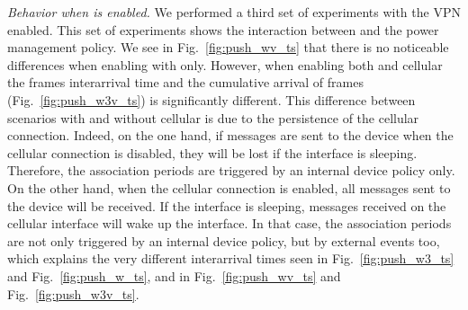 




\noindent\emph{Behavior when \meddle is enabled.} We performed a third set of experiments with the VPN enabled. This set
of experiments shows the interaction between \meddle 
and the power management policy. We see in
Fig.~\ref{fig:push_wv_ts} that
there is no noticeable differences when enabling \meddle with \wifi{} only. However,
when enabling both \wifi and cellular the frames interarrival time
and the cumulative arrival of frames (Fig.~\ref{fig:push_w3v_ts}) is
significantly different. This difference between scenarios with and
without cellular is due to the persistence of the cellular connection. Indeed, on
the one hand, if messages are sent to the device when the cellular connection is disabled,
they will be lost if the \wifi interface is sleeping. Therefore, the
\wifi association periods are triggered by an internal device policy
only. On the other hand, when the cellular connection is enabled, all
messages sent to the device will be received. If the \wifi interface
is sleeping, messages received on the cellular interface will wake up the
\wifi interface. In that case, the \wifi association periods are not
only triggered by an internal device policy, but by external events
too, which explains the very different interarrival times seen in
Fig.~\ref{fig:push_w3_ts} and Fig.~\ref{fig:push_w_ts}, and in
Fig.~\ref{fig:push_wv_ts} and Fig.~\ref{fig:push_w3v_ts}.


